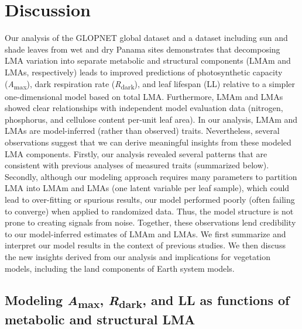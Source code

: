 \documentclass[
  12pt,
  letterpaper,
  DIV=11,
  numbers=noendperiod]{scrartcl}
\begin{document}
\section{Discussion}\label{discussion}

Our analysis of the GLOPNET global dataset and a dataset including sun
and shade leaves from wet and dry Panama sites demonstrates that
decomposing LMA variation into separate metabolic and structural
components (LMAm and LMAs, respectively) leads to improved predictions
of photosynthetic capacity (\emph{A}\textsubscript{max}), dark
respiration rate (\emph{R}\textsubscript{dark}), and leaf lifespan (LL)
relative to a simpler one-dimensional model based on total LMA.
Furthermore, LMAm and LMAs showed clear relationships with independent
model evaluation data (nitrogen, phosphorus, and cellulose content
per-unit leaf area). In our analysis, LMAm and LMAs are model-inferred
(rather than observed) traits. Nevertheless, several observations
suggest that we can derive meaningful insights from these modeled LMA
components. Firstly, our analysis revealed several patterns that are
consistent with previous analyses of measured traits (summarized below).
Secondly, although our modeling approach requires many parameters to
partition LMA into LMAm and LMAs (one latent variable per leaf sample),
which could lead to over-fitting or spurious results, our model
performed poorly (often failing to converge) when applied to randomized
data. Thus, the model structure is not prone to creating signals from
noise. Together, these observations lend credibility to our
model-inferred estimates of LMAm and LMAs. We first summarize and
interpret our model results in the context of previous studies. We then
discuss the new insights derived from our analysis and implications for
vegetation models, including the land components of Earth system models.

\subsection{\texorpdfstring{Modeling \emph{A}\textsubscript{max},
\emph{R}\textsubscript{dark}, and LL as functions of metabolic and
structural
LMA}{Modeling Amax, Rdark, and LL as functions of metabolic and structural LMA}}\label{modeling-amax-rdark-and-ll-as-functions-of-metabolic-and-structural-lma}
\end{document}
